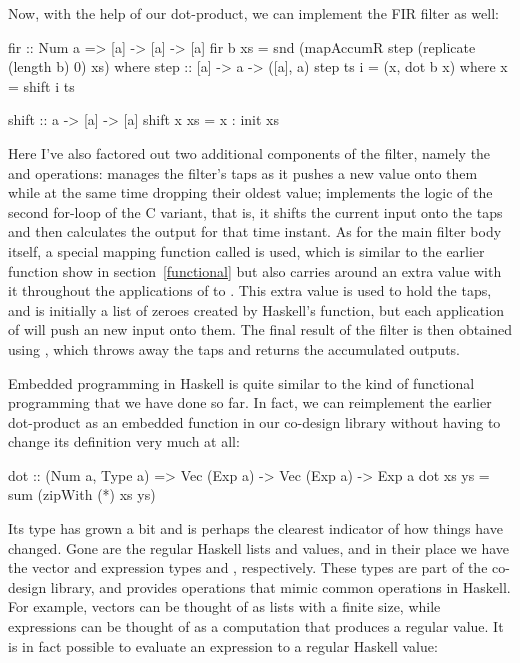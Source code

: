 Now, with the help of our dot-product, we can implement the FIR filter as well:

\begin{code}
fir :: Num a => [a] -> [a] -> [a]
fir b xs = snd (mapAccumR step (replicate (length b) 0) xs)
  where
    step :: [a] -> a -> ([a], a)
    step ts i = (x, dot b x)
      where x = shift i ts
  
    shift :: a -> [a] -> [a]
    shift x xs = x : init xs
\end{code}

\noindent Here I've also factored out two additional components of the filter, namely the  and  operations:  manages the filter's taps as it pushes a new value onto them while at the same time dropping their oldest value;  implements the logic of the second for-loop of the C variant, that is, it shifts the current input onto the taps and then calculates the output for that time instant. As for the main filter body itself, a special mapping function called  is used, which is similar to the earlier  function show in section~\ref{functional} but also carries around an extra value with it throughout the applications of  to . This extra value is used to hold the taps, and is initially a list of zeroes created by Haskell's  function, but each application of  will push an new input onto them. The final result of the filter is then obtained using , which throws away the taps and returns the accumulated outputs.

Embedded programming in Haskell is quite similar to the kind of functional programming that we have done so far. In fact, we can reimplement the earlier dot-product as an embedded function in our co-design library without having to change its definition very much at all:

\begin{code}
dot :: (Num a, Type a) => Vec (Exp a) -> Vec (Exp a) -> Exp a
dot xs ys = sum (zipWith (*) xs ys)
\end{code}

\noindent Its type has grown a bit and is perhaps the clearest indicator of how things have changed. Gone are the regular Haskell lists and values, and in their place we have the vector and expression types  and , respectively. These types are part of the co-design library, and provides operations that mimic common operations in Haskell. For example, vectors can be thought of as lists with a finite size, while expressions can be thought of as a computation that produces a regular value. It is in fact possible to evaluate an expression to a regular Haskell value:

